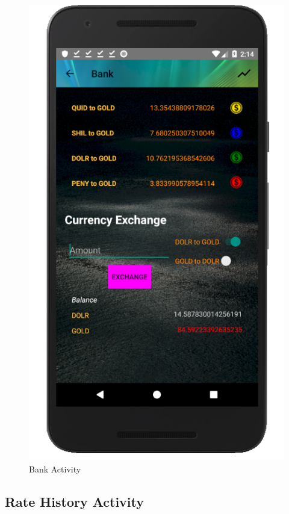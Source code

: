 \documentclass[12pt]{article}
\begin{document}
\begin{figure}
	\includegraphics[scale=0.25]{BankActivityExchange.png}
	\caption{\label{fig:bank}Bank Activity}
\end{figure}

\subsection{\color{red}Rate History Activity}
\end{document}
